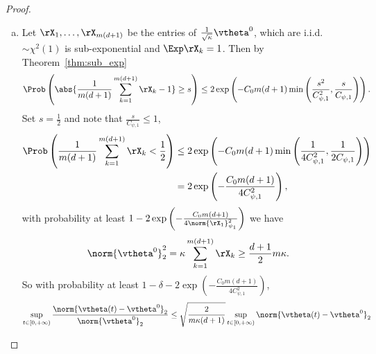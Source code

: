 \documentclass{article}
\begin{document}
\begin{proof}
\begin{enumerate}[(a)]
\begin{enumerate}[(i)]
\begin{equation}
                            \RS(\vtheta(t))\leq\exp\left(-\frac{m}{n}\frac{\kappa}{\kappa'}\lambda_S^{(a)}t\right)\RS(\vtheta^0).
                        \end{equation}
                        Suppose that $t^*_a<+\infty$ then one can take the limit $t\to t^*_a$ in~\eqref{thm-proof:w-step1}. This will lead to a contradiction with the definition of $t^*$. Therefore $t^*_a=+\infty$.
              \end{enumerate}
        \item Let $\rX_1, \ldots, \rX_{m(d+1)}$ be the entries of $\frac{1}{\sqrt{\kappa}}\vtheta^0$, which are i.i.d. $\sim\chi^2(1)$ is sub-exponential and $\Exp\rX_k=1$. Then by Theorem~\ref{thm:sub_exp}
              \begin{equation}
                  \Prob\left(\abs{\frac{1}{m(d+1)}\sum_{k=1}^{m(d+1)}\rX_k-1}\geq s\right)\leq 2\exp\left(-C_0 m(d+1) \min\left(\frac{s^2}{C^2_{\psi,1}},\frac{s}{C_{\psi,1}}\right)\right).
              \end{equation}
              Set $s=\frac{1}{2}$ and note that $\frac{s}{C_{\psi,1}}\leq 1$,
              \begin{equation}
                  \begin{aligned}
                      \Prob\left(\frac{1}{m(d+1)}\sum_{k=1}^{m(d+1)}\rX_k<\frac{1}{2}\right)
                       & \leq 2\exp\left(-C_0 m(d+1) \min\left(\frac{1}{4C^2_{\psi,1}},\frac{1}{2C_{\psi,1}}\right)\right) \\
                       & =2\exp\left(-\frac{C_0m(d+1)}{4C^2_{\psi,1}}\right),
                  \end{aligned}
              \end{equation}
              with probability at least $1-2\exp\left(-\frac{C_0m(d+1)}{4\norm{\rX_1}^2_{\psi_1}}\right)$ we have
              \begin{equation}
                  \norm{\vtheta^0}^2_2=\kappa\sum_{k=1}^{m(d+1)}\rX_k\geq\frac{d+1}{2}m\kappa.
              \end{equation}
              So with probability at least $1-\delta-2\exp\left(-\frac{C_0m(d+1)}{4C^2_{\psi,1}}\right)$,
              \begin{equation}
                  \begin{aligned}
                      \sup\limits_{t\in[0,+\infty)}\frac{\norm{\vtheta(t)-\vtheta^0}_2}{\norm{\vtheta^0}_2}
                       & \leq \sqrt{\frac{2}{m\kappa(d+1)}}\sup\limits_{t\in[0,+\infty)}\norm{\vtheta(t)-\vtheta^0}_2                                            \\

\end{aligned}
\end{equation}
\end{enumerate}
\end{proof}
\end{document}
